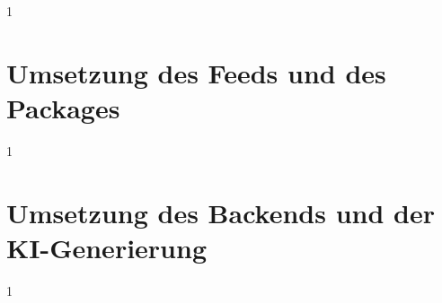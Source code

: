 \documentclass[12pt,a4paper,titlepage,listof=totoc,bibliography=totoc,chapteratlists=0pt]{scrreprt}
\begin{document}
\begin{spacing}{1}
\chapter{Umsetzung des Feeds und des Packages}\label{chapter:feedimpl}
\end{spacing}


\begin{spacing}{1}
\chapter{Umsetzung des Backends und der KI-Generierung}\label{chapter:backendimpl}
\end{spacing}



\begin{spacing}{1}
\chapter{}\label{chapter:summary} %
\end{spacing}


\newpage
{}
\setcounter{page}{\value{RPages}}
\glsnogroupskiptrue
{}
{
	\printglossary[title=Glossar,toctitle=Glossar] %
}
{
	\printglossary[title=Glossary,toctitle=Glossary] %
}
\listoffigures
\listoftables
\lstlistoflistings
\appendix
{}

\end{document}
